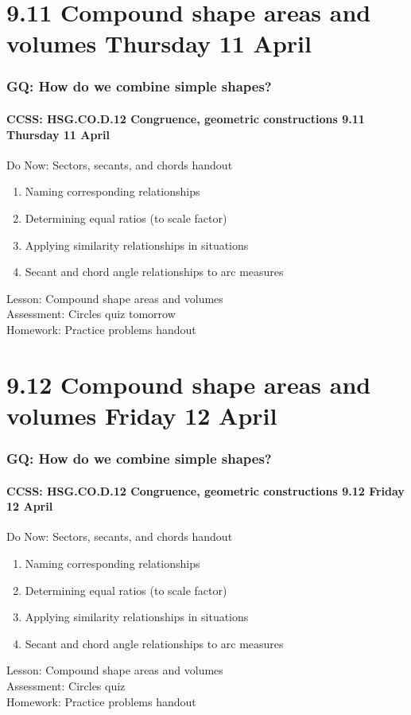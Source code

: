 \documentclass{beamer}
\begin{document}
\section{9.11 Compound shape areas and volumes Thursday 11 April}
  \frame
  {
    \frametitle{GQ: How do we combine simple shapes?}
    \framesubtitle{CCSS: HSG.CO.D.12 Congruence, geometric constructions \hfill \alert{9.11 Thursday 11 April}}

    \begin{block}{Do Now: Sectors, secants, and chords handout}
      \begin{enumerate}
        \item Naming corresponding relationships
        \item Determining equal ratios (to scale factor)
        \item Applying similarity relationships in situations
        \item Secant and chord angle relationships to arc measures
      \end{enumerate}
    \end{block}
    Lesson: Compound shape areas and volumes\\
    Assessment: Circles quiz \alert{tomorrow}\\
    Homework: Practice problems handout
  }

\section{9.12 Compound shape areas and volumes Friday 12 April}
  \frame
  {
    \frametitle{GQ: How do we combine simple shapes?}
    \framesubtitle{CCSS: HSG.CO.D.12 Congruence, geometric constructions \hfill \alert{9.12 Friday 12 April}}

    \begin{block}{Do Now: Sectors, secants, and chords handout}
      \begin{enumerate}
        \item Naming corresponding relationships
        \item Determining equal ratios (to scale factor)
        \item Applying similarity relationships in situations
        \item Secant and chord angle relationships to arc measures
      \end{enumerate}
    \end{block}
    Lesson: Compound shape areas and volumes\\
    Assessment: Circles quiz\\
    Homework: Practice problems handout
  }
\end{document}
